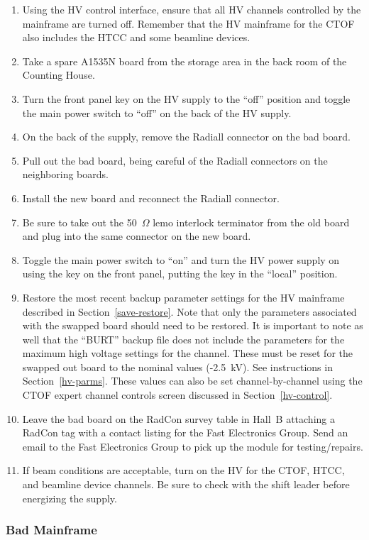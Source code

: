 \documentclass[12pt]{article}
\begin{document}
\begin{enumerate}
\item Using the HV control interface, ensure that all HV channels controlled by the mainframe are turned off.
Remember that the HV mainframe for the CTOF also includes the HTCC and some beamline devices.
\item Take a spare A1535N board from the storage area in the back room of the Counting House.
\item Turn the front panel key on the HV supply to the ``off'' position and toggle the main power switch to
``off'' on the back of the HV supply.
\item On the back of the supply, remove the Radiall connector on the bad board.
\item Pull out the bad board, being careful of the Radiall connectors on the neighboring boards.
\item Install the new board and reconnect the Radiall connector.
\item Be sure to take out the 50~$\Omega$ lemo interlock terminator from the old board and plug into the
same connector on the new board.
\item Toggle the main power switch to ``on'' and turn the HV power supply on using the key on the front panel,
putting the key in the ``local'' position.
\item Restore the most recent backup parameter settings for the HV mainframe described in
Section~\ref{save-restore}. Note that only the parameters associated with the swapped board should need to
be restored. It is important to note as well that the ``BURT'' backup file does not include the parameters for
the maximum high voltage settings for the channel. These must be reset for the swapped out board to the
nominal values (-2.5~kV). See instructions in Section~\ref{hv-parms}. These values can also be set
channel-by-channel using the CTOF expert channel controls screen discussed in Section~\ref{hv-control}.
\item Leave the bad board on the RadCon survey table in Hall~B attaching a RadCon tag with a contact listing
for the Fast Electronics Group. Send an email to the Fast Electronics Group to pick up the module for
testing/repairs.
\item If beam conditions are acceptable, turn on the HV for the CTOF, HTCC, and beamline device channels. Be
sure to check with the shift leader before energizing the supply.
\end{enumerate}

\subsubsection{Bad Mainframe}
\label{mainframe}
\end{document}
